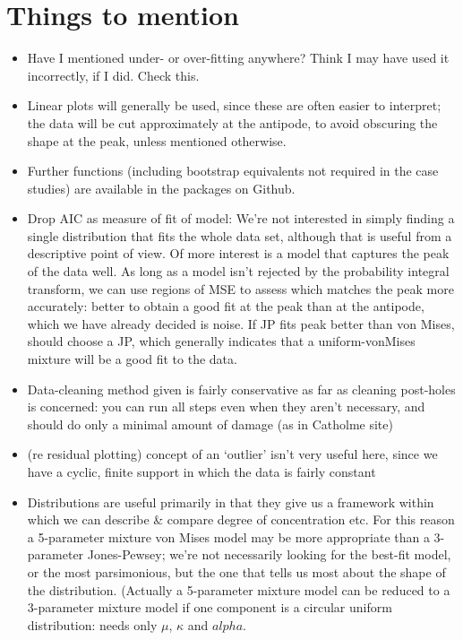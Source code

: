 \documentclass[12pt,fleqn]{article}
\numberwithin{equation}{section}
\numberwithin{figure}{section}
\numberwithin{table}{section}
\begin{document}
\section*{Things to mention}
\begin{itemize}

\item
Have I mentioned under- or over-fitting anywhere? Think I may have used it incorrectly, if I did. Check this.

\item
Linear plots will generally be used, since these are often easier to interpret; the data will be cut approximately at the antipode, to avoid obscuring the shape at the peak, unless mentioned otherwise.

\item
Further functions (including bootstrap equivalents not required in the case studies) are available in the packages on Github.

\item
Drop AIC as measure of fit of model: We're not interested in simply finding a single distribution that fits the whole data set, although that is useful from a descriptive point of view. Of more interest is a model that captures the peak of the data well. As long as a model isn't rejected by the probability integral transform, we can use regions of MSE to assess which matches the peak more accurately: better to obtain a good fit at the peak than at the antipode, which we have already decided is noise. If JP fits peak better than von Mises, should choose a JP, which generally indicates that a uniform-vonMises mixture will be a good fit to the data.


\item
Data-cleaning method given is fairly conservative as far as cleaning post-holes is concerned: you can run all steps even when they aren't necessary, and should do only a minimal amount of damage (as in Catholme site)

\item
(re residual plotting) concept of an `outlier' isn't very useful here, since we have a cyclic, finite support in which the data is fairly constant
 
\item
Distributions are useful primarily in that they give us a framework within which we can  describe \& compare degree of concentration etc. For this reason a 5-parameter mixture von Mises model may be more appropriate than a 3-parameter Jones-Pewsey; we're not necessarily looking for the best-fit model, or the most parsimonious, but the one that tells us most about the shape of the distribution. (Actually a 5-parameter mixture model can be reduced to a 3-parameter mixture model if one component is a circular uniform distribution: needs only $\mu$, $\kappa$ and $alpha$.


\end{itemize}
\end{document}
